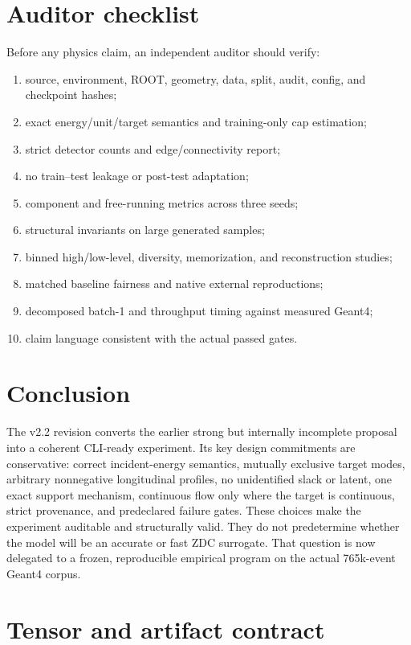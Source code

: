 \documentclass[10pt,a4paper]{article}
\begin{document}
\section{Auditor checklist}

Before any physics claim, an independent auditor should verify:
\begin{enumerate}
\item source, environment, ROOT, geometry, data, split, audit, config, and checkpoint hashes;
\item exact energy/unit/target semantics and training-only cap estimation;
\item strict detector counts and edge/connectivity report;
\item no train--test leakage or post-test adaptation;
\item component and free-running metrics across three seeds;
\item structural invariants on large generated samples;
\item binned high/low-level, diversity, memorization, and reconstruction studies;
\item matched baseline fairness and native external reproductions;
\item decomposed batch-1 and throughput timing against measured Geant4;
\item claim language consistent with the actual passed gates.
\end{enumerate}

\section{Conclusion}

The v2.2 revision converts the earlier strong but internally incomplete proposal into a coherent CLI-ready experiment. Its key design commitments are conservative: correct incident-energy semantics, mutually exclusive target modes, arbitrary nonnegative longitudinal profiles, no unidentified slack or latent, one exact support mechanism, continuous flow only where the target is continuous, strict provenance, and predeclared failure gates. These choices make the experiment auditable and structurally valid. They do not predetermine whether the model will be an accurate or fast ZDC surrogate. That question is now delegated to a frozen, reproducible empirical program on the actual 765k-event Geant4 corpus.


\appendix
\section{Tensor and artifact contract}
\end{document}
